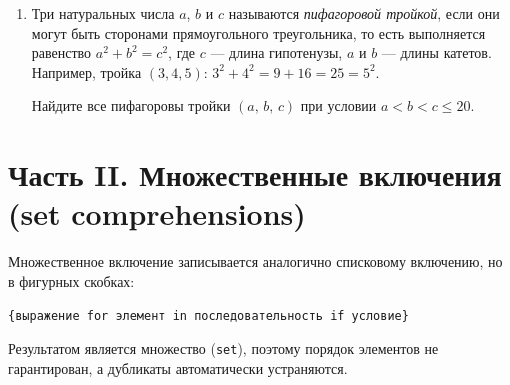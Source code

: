 \documentclass[a4,12pt]{article}
\theoremstyle{remark}
\begin{document}
\begin{enumerate}
    \begin{exercisehint}
        Включение может содержать два \texttt{for} подряд — это эквивалентно
        двум вложенным циклам.
    \end{exercisehint}

    \item Три натуральных числа $a$, $b$ и $c$ называются \emph{пифагоровой тройкой},
    если они могут быть сторонами прямоугольного треугольника,
    то есть выполняется равенство $a^2 + b^2 = c^2$,
    где $c$ --- длина гипотенузы, $a$ и $b$ --- длины катетов.
    Например, тройка $(3, 4, 5)$: $3^2 + 4^2 = 9 + 16 = 25 = 5^2$.


    Найдите все пифагоровы тройки $(a,\, b,\, c)$ при условии $a < b < c \leqslant 20$.

\end{enumerate}

\section*{Часть II. Множественные включения (set comprehensions)}

\begin{exercisenote}[title=Синтаксис]
Множественное включение записывается аналогично списковому включению,
но в фигурных скобках:
\begin{center}
    \texttt{\{выражение\ for\ элемент\ in\ последовательность\ if\ условие\}}
\end{center}
Результатом является множество (\texttt{set}), поэтому порядок элементов
не гарантирован, а дубликаты автоматически устраняются.
\end{exercisenote}
\end{document}

